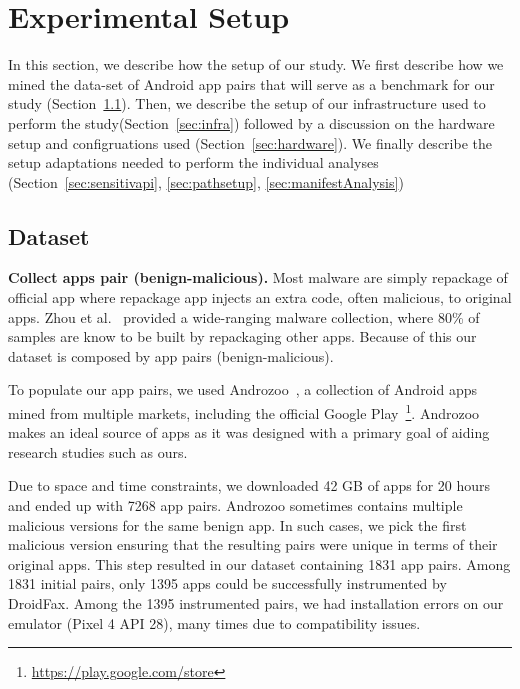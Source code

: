 \section{Experimental Setup}\label{sec:experimentalSetup}

In this section, we describe how the setup of our study. We first describe how we mined the data-set of Android app pairs that will serve as a benchmark for our study (Section~\ref{sec:dataset}).  Then, we describe the setup of our infrastructure used to perform the study(Section~\ref{sec:infra}) followed by a discussion on the hardware setup and configruations used (Section~\ref{sec:hardware}). We finally describe the setup adaptations needed to perform the individual analyses (Section~\ref{sec:sensitivapi}, \ref{sec:pathsetup}, \ref{sec:manifestAnalysis})

\subsection{Dataset}\label{sec:dataset}
\textbf{Collect apps pair (benign-malicious).} Most malware are simply repackage of official app where repackage app injects an extra code, often malicious, to original apps. Zhou et al.~\cite{DBLP:conf/sp/ZhouJ12} provided a wide-ranging malware collection, where 80\% of samples are know to be built by repackaging other apps. Because of this our dataset is composed by app pairs (benign-malicious).


To populate our app pairs, we used Androzoo~\cite{DBLP:conf/msr/AllixBKT16}, a collection of Android apps mined from multiple markets, including the official Google Play~\footnote{\url{https://play.google.com/store}}. Androzoo makes an ideal source of apps as it was designed with a primary goal of aiding research studies such as ours. 

Due to space and time constraints, we downloaded 42 GB of apps for 20 hours and ended up with 7268 app pairs. Androzoo sometimes contains multiple malicious versions for the same benign app. In such cases, we pick the first malicious version ensuring that the resulting pairs were unique in terms of their original apps. This step resulted in our dataset containing 1831 app pairs. Among 1831 initial pairs, only 1395 apps could be successfully instrumented by DroidFax. Among the 1395 instrumented pairs, we had installation errors on our emulator (Pixel 4 API 28), many times due to compatibility issues. 

